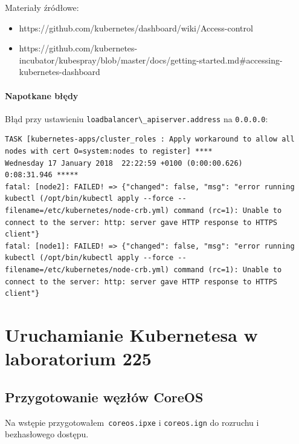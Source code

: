 \documentclass[a4paper,12pt,twoside,openany]{report}
\providecommand{\tightlist}{%
  \setlength{\itemsep}{0pt}\setlength{\parskip}{0pt}}
\newcommand{\passthrough}[1]{#1}
\begin{document}
Materiały źródłowe:

\begin{itemize}
\tightlist
\item
  https://github.com/kubernetes/dashboard/wiki/Access-control
\item
  https://github.com/kubernetes-incubator/kubespray/blob/master/docs/getting-started.md\#accessing-kubernetes-dashboard
\end{itemize}

\hypertarget{napotkane-bux142ux119dy-1}{%
\subsubsection{Napotkane błędy}\label{napotkane-bux142ux119dy-1}}

Błąd przy ustawieniu
\passthrough{\lstinline!loadbalancer\_apiserver.address!} na
\passthrough{\lstinline!0.0.0.0!}:

\begin{lstlisting}
TASK [kubernetes-apps/cluster_roles : Apply workaround to allow all nodes with cert O=system:nodes to register] ****
Wednesday 17 January 2018  22:22:59 +0100 (0:00:00.626)       0:08:31.946 *****
fatal: [node2]: FAILED! => {"changed": false, "msg": "error running kubectl (/opt/bin/kubectl apply --force --filename=/etc/kubernetes/node-crb.yml) command (rc=1): Unable to connect to the server: http: server gave HTTP response to HTTPS client"}
fatal: [node1]: FAILED! => {"changed": false, "msg": "error running kubectl (/opt/bin/kubectl apply --force --filename=/etc/kubernetes/node-crb.yml) command (rc=1): Unable to connect to the server: http: server gave HTTP response to HTTPS client"}
\end{lstlisting}

\hypertarget{uruchamianie-kubernetesa-w-laboratorium-225}{%
\chapter{Uruchamianie Kubernetesa w laboratorium
225}\label{uruchamianie-kubernetesa-w-laboratorium-225}}

\hypertarget{przygotowanie-wux119zux142uxf3w-coreos}{%
\section{Przygotowanie węzłów
CoreOS}\label{przygotowanie-wux119zux142uxf3w-coreos}}

Na wstępie przygotowałem~\passthrough{\lstinline!coreos.ipxe!} i
\passthrough{\lstinline!coreos.ign!} do rozruchu i bezhasłowego dostępu.
\end{document}

